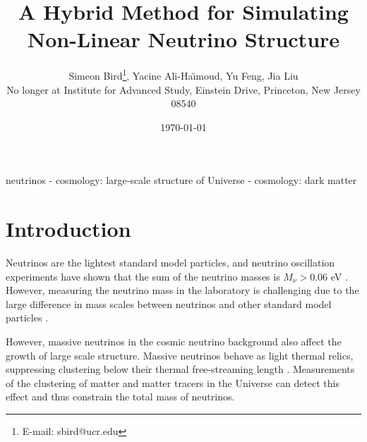 \documentclass[useAMS, usenatbib]{mnras}
\title{A Hybrid Method for Simulating Non-Linear Neutrino Structure}
\author[ S. Bird et al.]{  Simeon Bird\thanks{E-mail: sbird@ucr.edu}, Yacine Ali-Ha\"{\i}moud, Yu Feng, Jia Liu\vspace{1.5mm}\\
No longer at Institute for Advanced Study, Einstein Drive, Princeton, New Jersey 08540}
\begin{document}
\date{\today}

\pagerange{\pageref{firstpage}--\pageref{lastpage}} 
\label{firstpage}

\maketitle

\begin{abstract}
\end{abstract}

\begin{keywords}
        neutrinos - cosmology: large-scale structure of Universe - cosmology: dark matter
\end{keywords}

\section{Introduction}


Neutrinos are the lightest standard model particles, and neutrino oscillation experiments have shown that the sum of the neutrino masses is $M_\nu > 0.06$ eV \citep{Becker-Szendy_1992, Fukuda_1998}.
However, measuring the neutrino mass in the laboratory is challenging due to the large difference in mass scales between neutrinos and other standard model particles \cite[although see][]{Wolf_2010}.

However, massive neutrinos in the cosmic neutrino background also affect the growth of large scale structure.
Massive neutrinos behave as light thermal relics, suppressing clustering below their thermal
free-streaming length \citep[e.g.][]{Lesgourgues_2006, Wong_2011}.
Measurements of the clustering of matter and matter tracers in the Universe can detect this effect and thus constrain the total mass of neutrinos.
\end{document}
